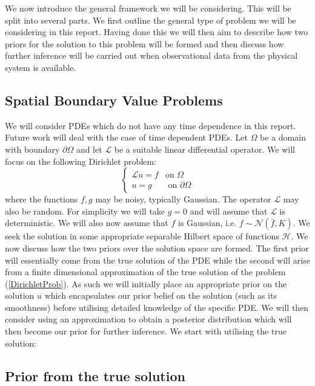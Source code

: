 \vspace{5pt}We now introduce the general framework we will be considering. This will be split into several parts. We first outline the general type of problem we will be considering in this report. Having done this we will then aim to describe how two priors for the solution to this problem will be formed and then discuss how further inference will be carried out when observational data from the physical system is available.


\subsection{Spatial Boundary Value Problems}

We will consider PDEs which do not have any time dependence in this report. Future work will deal with the case of time dependent PDEs. Let $\Omega$ be a domain with boundary $\partial\Omega$ and let $\mathcal{L}$ be a suitable linear differential operator. We will focus on the following Dirichlet problem:
\begin{equation}
\label{DirichletProb}
    \left\{
    \begin{array}{cc}
        \mathcal{L}u=f & \text{on } \Omega  \\
         u = g  & \text{ on } \partial\Omega
    \end{array}
    \right.
\end{equation}
where the functions $f,g$ may be noisy, typically Gaussian. The operator $\mathcal{L}$ may also be random. For simplicity we will take $g=0$ and will assume that $\mathcal{L}$ is deterministic. We will also now assume that $f$ is Gaussian, i.e. $f\sim\mathcal{N}(\bar{f},K)$. We seek the solution in some appropriate separable Hilbert space of functions $\mathcal{H}$. We now discuss how the two priors over the solution space are formed. The first prior will essentially come from the true solution of the PDE while the second will arise from a finite dimensional approximation of the true solution of the problem (\ref{DirichletProb}). As such we will initially place an appropriate prior on the solution $u$ which encapsulates our prior belief on the solution (such as its smoothness) before utilising detailed knowledge of the specific PDE. We will then consider using an approximation to obtain a posterior distribution which will then become our prior for further inference. We start with utilising the true solution:

\subsection{Prior from the true solution}
\label{prior_true_solution}

